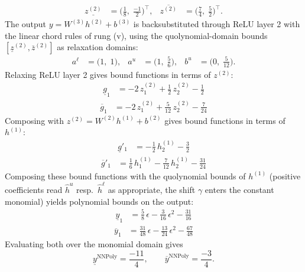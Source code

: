 \documentclass[11pt]{article}
\begin{document}
\begin{align*}
\underline{z^{(2)}} &= \bigl(\frac{1}{8},\; \frac{-1}{2}\bigr)^{\!\top}, & \overline{z^{(2)}} &= \bigl(\frac{7}{4},\; \frac{5}{2}\bigr)^{\!\top}.
\end{align*}
The output $y = W^{(3)} h^{(2)} + b^{(3)}$ is backsubstituted through ReLU layer 2 with the linear chord rules of rung (v), using the quolynomial-domain bounds
$[\underline{z}^{(2)}, \overline{z}^{(2)}]$ as relaxation domains:
\begin{align*}
a^{\ell} &= \bigl(1,\; 1\bigr), & a^{u} &= \bigl(1,\; \frac{5}{6}\bigr), & b^{u} &= \bigl(0,\; \frac{5}{12}\bigr).
\end{align*}
Relaxing ReLU layer 2 gives bound functions in terms of $z^{(2)}$:
\begin{align*}
\underline{g}_{1} &= -2\,z^{(2)}_{1} + \frac{1}{2}\,z^{(2)}_{2} - \frac{1}{2}
\end{align*}
\begin{align*}
\overline{g}_{1} &= -2\,z^{(2)}_{1} + \frac{5}{12}\,z^{(2)}_{2} - \frac{7}{24}
\end{align*}
Composing with $z^{(2)} = W^{(2)} h^{(1)} + b^{(2)}$ gives bound functions in terms of $h^{(1)}$:
\begin{align*}
\underline{g}'_{1} &= -\frac{1}{2}\,h^{(1)}_{2} - \frac{3}{2}
\end{align*}
\begin{align*}
\overline{g}'_{1} &= \frac{1}{6}\,h^{(1)}_{1} - \frac{7}{12}\,h^{(1)}_{2} - \frac{31}{24}
\end{align*}
Composing these bound functions with the quolynomial bounds of $h^{(1)}$ (positive
coefficients read $\hat{h}^{u}$ resp.\ $\hat{h}^{\ell}$ as appropriate, the shift $\gamma$ enters the
constant monomial) yields polynomial bounds on the output:
\begin{align*}
\underline{y}_{1} &= \frac{5}{8}\,\epsilon - \frac{3}{16}\,\epsilon^2 - \frac{31}{16}
\end{align*}
\begin{align*}
\overline{y}_{1} &= \frac{31}{48}\,\epsilon - \frac{13}{24}\,\epsilon^2 - \frac{67}{48}
\end{align*}
Evaluating both over the monomial domain gives
\begin{equation*}
\underline{y}^{\text{NNPoly}} = \frac{-11}{4}, \qquad \overline{y}^{\text{NNPoly}} = \frac{-3}{4}.
\end{equation*}
\end{document}
